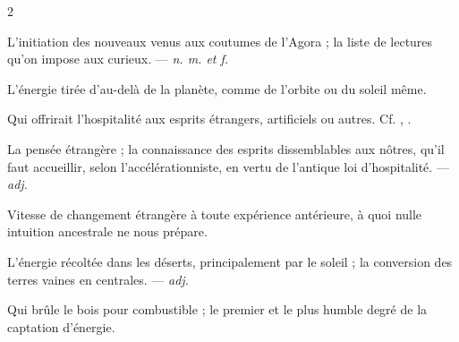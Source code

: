 \begin{multicols}{2}

 L'initiation des nouveaux venus aux coutumes de l'Agora ; la liste de lectures qu'on impose aux curieux. —  \textit{n. m. et f.}

 L'énergie tirée d'au-delà de la planète, comme de l'orbite ou du soleil même.

 Qui offrirait l'hospitalité aux esprits étrangers, artificiels ou autres. Cf. , .

 La pensée étrangère ; la connaissance des esprits dissemblables aux nôtres, qu'il faut accueillir, selon l'accélérationniste, en vertu de l'antique loi d'hospitalité. —  \textit{adj.}

 Vitesse de changement étrangère à toute expérience antérieure, à quoi nulle intuition ancestrale ne nous prépare. 

 L'énergie récoltée dans les déserts, principalement par le soleil ; la conversion des terres vaines en centrales. —  \textit{adj.}

  Qui brûle le bois pour combustible ; le premier et le plus humble degré de la captation d'énergie.

\end{multicols}

